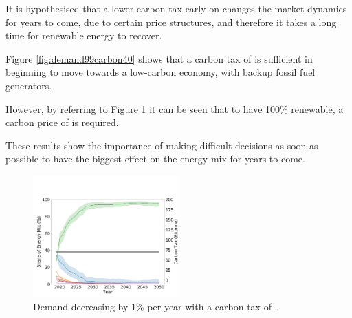 It is hypothesised that a lower carbon tax early on changes the market dynamics for years to come, due to certain price structures, and therefore it takes a long time for renewable energy to recover.

Figure \ref{fig:demand99carbon40} shows that a carbon tax of  is sufficient in beginning to move towards a low-carbon economy, with backup fossil fuel generators.

However, by referring to Figure \ref{fig:demand99carbon70} it can be seen that to have 100\% renewable, a carbon price of  is required. 

These results show the importance of making difficult decisions as soon as possible to have the biggest effect on the energy mix for years to come.

\begin{figure}
	\begin{center}
		\includegraphics[width=0.5\textwidth]{figures/scenarios/demand099-carbon70-datetime.png}
		\caption{{\color{blue}Demand decreasing by 1\% per year with a carbon tax of .}}
		\label{fig:demand99carbon70}
	\end{center}
\end{figure}



